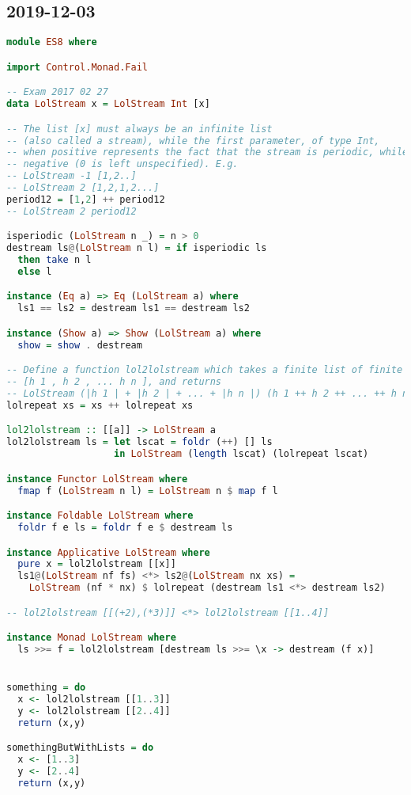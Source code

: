 \subsection{2019-12-03}
\begin{lstlisting}[language=Haskell]
module ES8 where

import Control.Monad.Fail

-- Exam 2017 02 27
data LolStream x = LolStream Int [x]

-- The list [x] must always be an infinite list
-- (also called a stream), while the first parameter, of type Int,
-- when positive represents the fact that the stream is periodic, while it is not periodic if
-- negative (0 is left unspecified). E.g.
-- LolStream -1 [1,2..]
-- LolStream 2 [1,2,1,2...]
period12 = [1,2] ++ period12
-- LolStream 2 period12

isperiodic (LolStream n _) = n > 0
destream ls@(LolStream n l) = if isperiodic ls
  then take n l
  else l

instance (Eq a) => Eq (LolStream a) where
  ls1 == ls2 = destream ls1 == destream ls2

instance (Show a) => Show (LolStream a) where
  show = show . destream

-- Define a function lol2lolstream which takes a finite list of finite lists
-- [h 1 , h 2 , ... h n ], and returns
-- LolStream (|h 1 | + |h 2 | + ... + |h n |) (h 1 ++ h 2 ++ ... ++ h n ++ h 1 ++ h 2 ++ ...)
lolrepeat xs = xs ++ lolrepeat xs

lol2lolstream :: [[a]] -> LolStream a
lol2lolstream ls = let lscat = foldr (++) [] ls
                   in LolStream (length lscat) (lolrepeat lscat)

instance Functor LolStream where
  fmap f (LolStream n l) = LolStream n $ map f l

instance Foldable LolStream where
  foldr f e ls = foldr f e $ destream ls

instance Applicative LolStream where
  pure x = lol2lolstream [[x]]
  ls1@(LolStream nf fs) <*> ls2@(LolStream nx xs) =
    LolStream (nf * nx) $ lolrepeat (destream ls1 <*> destream ls2)

-- lol2lolstream [[(+2),(*3)]] <*> lol2lolstream [[1..4]]

instance Monad LolStream where
  ls >>= f = lol2lolstream [destream ls >>= \x -> destream (f x)]


something = do
  x <- lol2lolstream [[1..3]]
  y <- lol2lolstream [[2..4]]
  return (x,y)

somethingButWithLists = do
  x <- [1..3]
  y <- [2..4]
  return (x,y)



\end{lstlisting}
